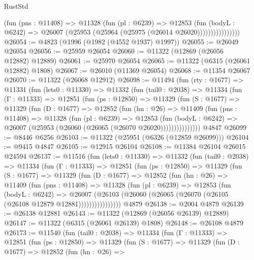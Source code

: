 \begin{lexlean}{RustStd}
\begin{coremodule}
                      (fun (pns : @11408) =>
                      @11328
                        (fun (pl : @6239) =>
                        @12853
                          (fun (bodyL : @6242) =>
                          @26007 (@25953 (@25964 (@25975 (@26014 @26020))))))))))))))))
@26054 := @4823 (@1996 (@1982 (@4552 @1937) @1997))
@26055 := @26049 @26054
@26056 := @25959 @26054
@26060 := @11322 (@12869 (@26056 @12882) @12889)
@26061 := @25970 @26054
@26065 := @11322 (@6315 (@26061 @12882) @1808)
@26067 := @26010 (@11369 @26054)
@26068 := @11354 @26067
@26070 := @11322 (@26068 @12912)
@26098 := @11494
    (fun (rty : @1677) =>
    @11331
      (fun (lets0 : @11330) =>
      @11332
        (fun (tail0 : @2038) =>
        @11334
          (fun (Γ : @11333) =>
          @12851
            (fun (ps : @12850) =>
            @11329
              (fun (S : @1677) =>
              @11329
                (fun (D : @1677) =>
                @12852
                  (fun (hn : @26) =>
                  @11409
                    (fun (pns : @11408) =>
                    @11328
                      (fun (pl : @6239) =>
                      @12853
                        (fun (bodyL : @6242) =>
                        @26007 (@25953 (@26060 (@26065 (@26070 @26020)))))))))))))))
    @4847
@26099 := @8446 @6256
@26103 := @11322 (@25951 (@6326 (@12859 @26099)))
@26104 := @9415 @4847
@26105 := @12915 @26104
@26108 := @11384 @26104 @26015 @24594
@26137 := @11516
    (fun (lets0 : @11330) =>
    @11332
      (fun (tail0 : @2038) =>
      @11334
        (fun (Γ : @11333) =>
        @12851
          (fun (ps : @12850) =>
          @11329
            (fun (S : @1677) =>
            @11329
              (fun (D : @1677) =>
              @12852
                (fun (hn : @26) =>
                @11409
                  (fun (pns : @11408) =>
                  @11328
                    (fun (pl : @6239) =>
                    @12853
                      (fun (bodyL : @6242) =>
                      @26007
                        (@26103
                          (@26060 (@26065 (@26070 (@26105 (@26108 @12879 @12881))))))))))))))))
    @4879
@26138 := @2004 @4879
@26139 := @26138 @12881
@26143 := @11322 (@12869 (@26056 @26139) @12889)
@26147 := @11322 (@6315 (@26061 @26139) @1808)
@26148 := @26108 @4879
@26173 := @11540
    (fun (tail0 : @2038) =>
    @11334
      (fun (Γ : @11333) =>
      @12851
        (fun (ps : @12850) =>
        @11329
          (fun (S : @1677) =>
          @11329
            (fun (D : @1677) =>
            @12852
              (fun (hn : @26) =>

\end{coremodule}
\end{lexlean}
